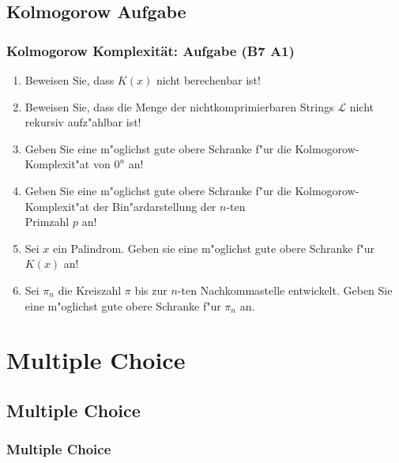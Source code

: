 \subsection{Kolmogorow Aufgabe}
\begin{frame}
	\frametitle{Kolmogorow Komplexität: Aufgabe (B7 A1)}
	\begin{enumerate}
		\item Beweisen Sie, dass $K(x)$ nicht berechenbar ist!
		\item Beweisen Sie, dass die Menge der nichtkomprimierbaren Strings $\mathcal{L}$
		nicht rekursiv aufz"ahlbar ist!
		\item Geben Sie eine m"oglichst gute obere Schranke f"ur die Kolmogorow-Komplexit"at von $0^n$ an!
		\item Geben Sie eine m"oglichst gute obere Schranke f"ur die Kolmogorow-Komplexit"at der
		Bin"ardarstellung der $n$-ten\\ Primzahl $p$ an!
		\item Sei $x$ ein Palindrom. Geben sie eine m"oglichst gute obere Schranke f"ur $K(x)$ an!
		\item Sei $\pi_n$ die Kreiszahl $\pi$ bis zur $n$-ten Nachkommastelle entwickelt. Geben Sie eine m"oglichst gute obere Schranke f"ur $\pi_n$ an.
	\end{enumerate}
\end{frame}

\section{Multiple Choice}
\subsection{Multiple Choice}
\begin{frame}
	\frametitle{Multiple Choice}
	\begin{center}
	\end{center}
\end{frame}

